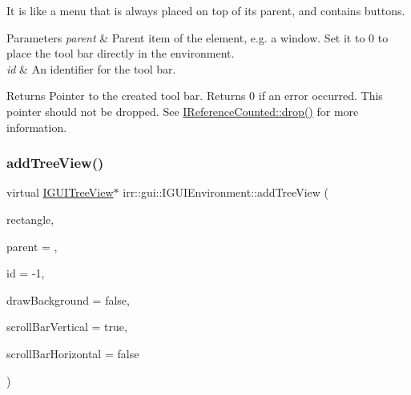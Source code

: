 It is like a menu that is always placed on top of its parent, and contains buttons. 
\begin{DoxyParams}{Parameters}
{\em parent} & Parent item of the element, e.\+g. a window. Set it to 0 to place the tool bar directly in the environment. \\
\hline
{\em id} & An identifier for the tool bar. \\
\hline
\end{DoxyParams}
\begin{DoxyReturn}{Returns}
Pointer to the created tool bar. Returns 0 if an error occurred. This pointer should not be dropped. See \hyperlink{classirr_1_1IReferenceCounted_a03856a09355b89d178090c4a5f738543}{I\+Reference\+Counted\+::drop()} for more information. 
\end{DoxyReturn}
\mbox{\label{classirr_1_1gui_1_1IGUIEnvironment_a3c82300cf7eaabc451ef20a04b432c32}} 
\subsubsection{\texorpdfstring{add\+Tree\+View()}{addTreeView()}\hspace{0.1cm}{\footnotesize\ttfamily [1/2]}}
{\footnotesize\ttfamily virtual \hyperlink{classirr_1_1gui_1_1IGUITreeView}{I\+G\+U\+I\+Tree\+View}$\ast$ irr\+::gui\+::\+I\+G\+U\+I\+Environment\+::add\+Tree\+View (\begin{DoxyParamCaption}\item[{const \hyperlink{classirr_1_1core_1_1rect}{core\+::rect}$<$ \hyperlink{namespaceirr_ac66849b7a6ed16e30ebede579f9b47c6}{s32} $>$ \&}]{rectangle,  }\item[{\hyperlink{classirr_1_1gui_1_1IGUIElement}{I\+G\+U\+I\+Element} $\ast$}]{parent = {},  }\item[{\hyperlink{namespaceirr_ac66849b7a6ed16e30ebede579f9b47c6}{s32}}]{id = {\ttfamily -\/1},  }\item[{bool}]{draw\+Background = {\ttfamily false},  }\item[{bool}]{scroll\+Bar\+Vertical = {\ttfamily true},  }\item[{bool}]{scroll\+Bar\+Horizontal = {\ttfamily false} }\end{DoxyParamCaption})\hspace{0.3cm}{\ttfamily [pure virtual]}}



